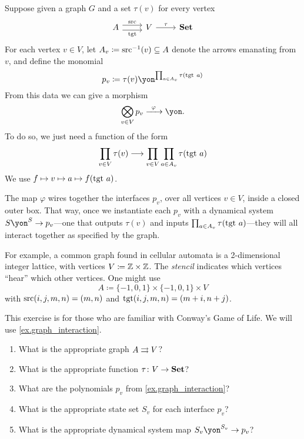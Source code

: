 \documentclass[Book-Poly]{subfiles}
\begin{document}
\begin{example}\label{ex.graph_interaction}
Suppose given a graph $G$ and a set $\tau(v)$ for every vertex
\[
\begin{tikzcd}
	A\ar[r, shift left=3pt, "\src"]\ar[r, shift right=3pt, "\tgt"']&
	V\ar[r, "\tau"]&
	\smset
\end{tikzcd}
\]
For each vertex $v\in V$, let $A_v\coloneqq\mathrm{src}^{-1}(v)\subseteq A$ denote the arrows emanating from $v$, and define the monomial
\[
	p_v\coloneqq\tau(v)\yon^{\prod_{a\in A_v}\tau(\tgt\ a)}
\]
From this data we can give a morphism
\[
\bigotimes_{v\in V}p_v\Too{\varphi}\yon.
\]
To do so, we just need a function of the form
\[
\prod_{v\in V}\tau(v)\longrightarrow\prod_{v\in V}\prod_{a\in A_v}\tau(\mathrm{tgt}\ a)
\]
We use $f\mapsto v\mapsto a\mapsto f(\mathrm{tgt}\ a)$.

The map $\varphi$ wires together the interfaces $p_v$, over all vertices $v\in V$, inside a closed outer box. That way, once we instantiate each $p_v$ with a dynamical system $S\yon^S\to p_v$---one that outputs $\tau(v)$ and inputs $\prod_{a\in A_v}\tau(\tgt\ a)$---they will all interact together as specified by the graph.

For example, a common graph found in cellular automata is a 2-dimensional integer lattice, with vertices $V\coloneqq\mathbb{Z}\times\mathbb{Z}$. The \emph{stencil} indicates which vertices ``hear'' which other vertices. One might use
\[A\coloneqq\{-1,0,1\}\times\{-1,0,1\}\times V\]
with $\mathrm{src}(i,j,m,n)=(m,n)$ and $\mathrm{tgt}(i,j,m,n)=(m+i, n+j)$.
\end{example}

\begin{exercise}\label{exc.conway}
This exercise is for those who are familiar with Conway's Game of Life. We will use \cref{ex.graph_interaction}.
\begin{enumerate}
	\item What is the appropriate graph $A\rightrightarrows V$?
	\item What is the appropriate function $\tau\colon V\to\mathbf{Set}$?
	\item What are the polynomials $p_v$ from \cref{ex.graph_interaction}?
	\item What is the appropriate state set $S_v$ for each interface $p_v$?
	\item What is the appropriate dynamical system map $S_v\yon^{S_v}\to p_v$?
\qedhere
\end{enumerate}
\end{exercise}
\end{document}

